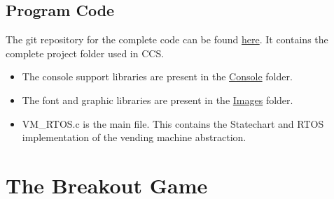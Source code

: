\documentclass[a4paper,12pt,oneside]{book}
\begin{document}
\subsection{Program Code}
\qquad The git repository for the complete code can be found \href{https://github.com/eYSIP-2017/eYSIP-2017_Game_Development-TI-RTOS/tree/master/Documentation/Vending\%20Machine/Vending\%20Machine\%20-\%20Code/Implemented\%20Code}{here}. It contains the complete project folder used in CCS. 
\begin{itemize}
  \item The console support libraries are present in the \href{https://github.com/eYSIP-2017/eYSIP-2017_Game_Development-TI-RTOS/tree/master/Documentation/Vending\%20Machine/Vending\%20Machine\%20-\%20Code/Implemented\%20Code/Console}{Console} folder. 
  \item The font and graphic libraries are present in the \href{https://github.com/eYSIP-2017/eYSIP-2017_Game_Development-TI-RTOS/tree/master/Documentation/Vending\%20Machine/Vending\%20Machine\%20-\%20Code/Implemented\%20Code/Images}{Images} folder.
  \item VM\_RTOS.c is the main file. This contains the Statechart and RTOS implementation of the vending machine abstraction.
\end{itemize}
\section{The Breakout Game}
\end{document}
